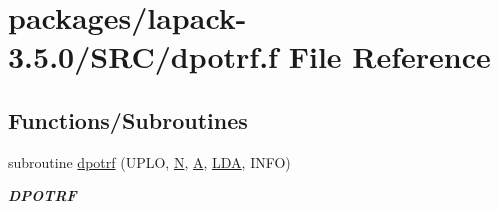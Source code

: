 \hypertarget{dpotrf_8f}{}\section{packages/lapack-\/3.5.0/\+S\+R\+C/dpotrf.f File Reference}
\label{dpotrf_8f}
\subsection*{Functions/\+Subroutines}
\begin{DoxyCompactItemize}
\item 
subroutine \hyperlink{group__doublePOcomputational_ga2f55f604a6003d03b5cd4a0adcfb74d6}{dpotrf} (U\+P\+L\+O, \hyperlink{polmisc_8c_a0240ac851181b84ac374872dc5434ee4}{N}, \hyperlink{classA}{A}, \hyperlink{example__user_8c_ae946da542ce0db94dced19b2ecefd1aa}{L\+D\+A}, I\+N\+F\+O)
\begin{DoxyCompactList}\small\item\em {\bfseries D\+P\+O\+T\+R\+F} \end{DoxyCompactList}\end{DoxyCompactItemize}
